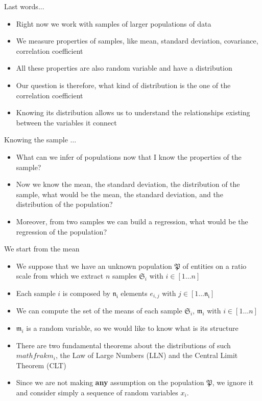\documentclass{beamer}
\begin{document}
\begin{frame}
{\centerline{Last words...}}

\begin{itemize}
\item Right now we work with samples of larger populations of data
\item We measure properties of samples, like mean, standard deviation, covariance, correlation coefficient
\item All these properties are also random variable and have a distribution
\item Our question is therefore, what kind of distribution is the one of the correlation coefficient
\item Knowing its distribution allows us to understand the relationships existing between the variables it connect
\end{itemize}


\end{frame}

\begin{frame}
{\centerline{Knowing the sample $\ldots$}}

\begin{itemize}
\item What can we infer of populations now that I know the properties of the sample?
\item Now we know the mean, the standard deviation, the distribution of the sample, what would be the mean, the standard deviation, and the distribution of the population?
\item Moreover, from two samples we can build a regression, what would be the regression of the population? 
\end{itemize}

\end{frame}

\begin{frame}
{\centerline{We start from the mean}}

\begin{itemize}
\item We suppose that we have an unknown population $\mathfrak{P}$ of entities on a ratio scale from which we extract $n$ samples $\mathfrak{S}_i$ with $i \in [1 \ldots{} n]$
\item Each sample $i$ is composed by $\mathfrak{n_i}$ elements $e_{i,j}$ with $j \in [1\ldots{}\mathfrak{n_i}]$
\item We can compute the set of the means of each sample $\mathfrak{S}_i$, $\mathfrak{m}_i$ with $i \in [1 \ldots{} n]$
\item $\mathfrak{m}_i$ is a random variable, so we would like to know what is its structure
\item There are two fundamental theorems about the distributions of such  $mathfrak{m}_i$, the Law of Large Numbers (LLN) and the Central Limit Theorem (CLT)
\item Since we are not making \textbf{any} assumption on the population  $\mathfrak{P}$, we ignore it and consider simply a sequence of random variables $x_i$.

\end{itemize}


\end{frame}
\end{document}
